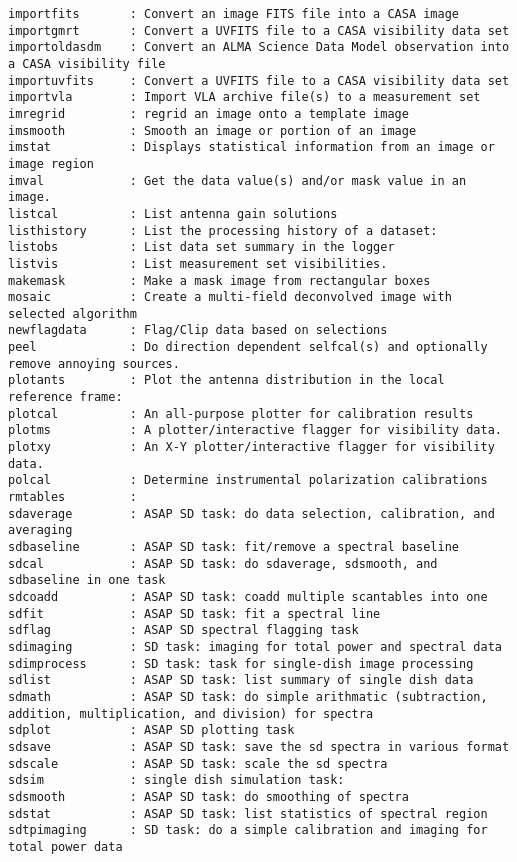 \begin{verbatim}
importfits       : Convert an image FITS file into a CASA image
importgmrt       : Convert a UVFITS file to a CASA visibility data set
importoldasdm    : Convert an ALMA Science Data Model observation into a CASA visibility file
importuvfits     : Convert a UVFITS file to a CASA visibility data set
importvla        : Import VLA archive file(s) to a measurement set
imregrid         : regrid an image onto a template image
imsmooth         : Smooth an image or portion of an image
imstat           : Displays statistical information from an image or image region
imval            : Get the data value(s) and/or mask value in an image.
listcal          : List antenna gain solutions
listhistory      : List the processing history of a dataset:
listobs          : List data set summary in the logger
listvis          : List measurement set visibilities.
makemask         : Make a mask image from rectangular boxes
mosaic           : Create a multi-field deconvolved image with selected algorithm
newflagdata      : Flag/Clip data based on selections
peel             : Do direction dependent selfcal(s) and optionally remove annoying sources.
plotants         : Plot the antenna distribution in the local reference frame:
plotcal          : An all-purpose plotter for calibration results 
plotms           : A plotter/interactive flagger for visibility data.
plotxy           : An X-Y plotter/interactive flagger for visibility data.
polcal           : Determine instrumental polarization calibrations
rmtables         : 
sdaverage        : ASAP SD task: do data selection, calibration, and averaging
sdbaseline       : ASAP SD task: fit/remove a spectral baseline 
sdcal            : ASAP SD task: do sdaverage, sdsmooth, and sdbaseline in one task
sdcoadd          : ASAP SD task: coadd multiple scantables into one
sdfit            : ASAP SD task: fit a spectral line
sdflag           : ASAP SD spectral flagging task 
sdimaging        : SD task: imaging for total power and spectral data
sdimprocess      : SD task: task for single-dish image processing
sdlist           : ASAP SD task: list summary of single dish data
sdmath           : ASAP SD task: do simple arithmatic (subtraction, addition, multiplication, and division) for spectra
sdplot           : ASAP SD plotting task 
sdsave           : ASAP SD task: save the sd spectra in various format
sdscale          : ASAP SD task: scale the sd spectra
sdsim            : single dish simulation task:
sdsmooth         : ASAP SD task: do smoothing of spectra
sdstat           : ASAP SD task: list statistics of spectral region
sdtpimaging      : SD task: do a simple calibration and imaging for total power data 

\end{verbatim}
